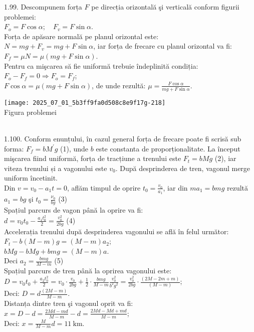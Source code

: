 1.99. Descompunem forța $F$ pe direcția orizontală şi verticală conform figurii problemei:\\ $F_{o}=F \cos \alpha; \quad F_{v}=F \sin \alpha$.\\ Forța de apăsare normală pe planul orizontal este:\\ $N=m g+F_{v}=m g+F \sin \alpha$, iar forța de frecare cu planul orizontal va fi:\\ $F_{f}=\mu N=\mu(m g+F \sin \alpha)$.\\ Pentru ca mişcarea să fie uniformă trebuie îndeplinită condiția:\\ $F_{o}-F_{f}=0 \Rightarrow F_{o}=F_{f}$;\\ $F \cos \alpha=\mu(m g+F \sin \alpha)$, de unde rezultă: $\mu=\frac{F \cos \alpha}{m g+F \sin \alpha}$.\\ \begin{center} \texttt{[image: 2025\_07\_01\_5b3ff9fa0d508c8e9f17g-218]}\\ Figura problemei \end{center}\\

1.100. Conform enunțului, în cazul general forța de frecare poate fi scrisă sub forma: $F_{f}=b M^{\prime} g$ (1), unde $b$ este constanta de proporționalitate. La început mişcarea fiind uniformă, forța de tracțiune a trenului este $F_{t}=b M g$ (2), iar viteza trenului și a vagonului este $v_{0}$. După desprinderea de tren, vagonul merge uniform încetinit.\\ Din $v=v_{0}-a_{1} t=0$, aflăm timpul de oprire $t_{0}=\frac{v_{0}}{a_{1}}$, iar din $m a_{1}=b m g$ rezultă $a_{1}=b g$ şi $t_{0}=\frac{\nu_{0}}{b g}$ (3)\\ Spațiul parcurs de vagon până la oprire va fi:\\ $d=v_{0} t_{0}-\frac{a_{1} t_{0}^{2}}{2}=\frac{v_{0}^{2}}{2 b g}$ (4)\\ Accelerația trenului după desprinderea vagonului se află în felul următor:\\ $F_{t}-b(M-m) g=(M-m) a_{2}$;\\ $b M g-b M g+b m g=(M-m) a$.\\ Deci $a_{2}=\frac{b m g}{M-m}$ (5)\\ Spațiul parcurs de tren până la oprirea vagonului este:\\ $D=v_{0} t_{0}+\frac{a_{2} t_{0}^{2}}{2}=v_{0} \cdot \frac{v_{0}}{2 b g}+\frac{1}{2} \cdot \frac{b m g}{M-m} \frac{v_{0}^{2}}{b^{2} g^{2}}=\frac{v_{0}^{2}}{2 b g} \cdot \frac{(2 M-2 m+m)}{(M-m)}$;\\ Deci: $D=d \frac{(2 M-m)}{M-m}$.\\ Distanța dintre tren şi vagonul oprit va fi:\\ $x=D-d=\frac{2 M d-m d}{M-m}-d=\frac{2 M d-M d+m d}{M-m}$;\\ Deci: $x=\frac{M}{M-m} d=11 \mathrm{~km}$.\\

